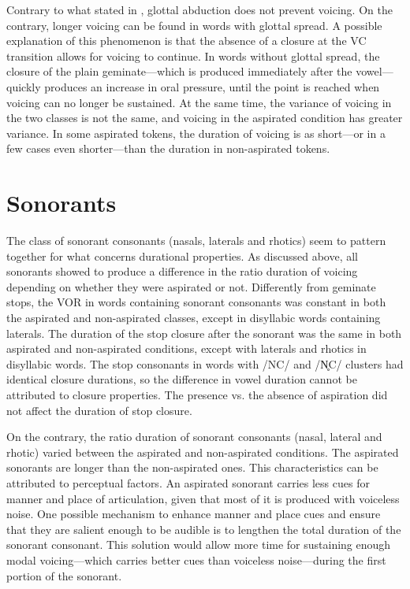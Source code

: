 \documentclass[11pt,a4paper,openany]{memoir}\usepackage[]{graphicx}\usepackage[]{color}
\begin{document}
Contrary to what stated in , glottal abduction does not prevent voicing.
On the contrary, longer voicing can be found in words with glottal spread.
A possible explanation of this phenomenon is that the absence of a closure at the VC transition allows for voicing to continue.
In words without glottal spread, the closure of the plain geminate---which is produced immediately after the vowel---quickly produces an increase in oral pressure, until the point is reached when voicing can no longer be sustained.
At the same time, the variance of voicing in the two classes is not the same, and voicing in the aspirated condition has greater variance.
In some aspirated tokens, the duration of voicing is as short---or in a few cases even shorter---than the duration in non-aspirated tokens.

\section{Sonorants}
The class of sonorant consonants (nasals, laterals and rhotics) seem to pattern together for what concerns durational properties.
As discussed above, all sonorants showed to produce a difference in the ratio duration of voicing depending on whether they were aspirated or not.
Differently from geminate stops, the VOR in words containing sonorant consonants was constant in both the aspirated and non-aspirated classes, except in disyllabic words containing laterals.
The duration of the stop closure after the sonorant was the same in both aspirated and non-aspirated conditions, except with laterals and rhotics in disyllabic words.
The stop consonants in words with /NC/ and /N̥C/ clusters had identical closure durations, so the difference in vowel duration cannot be attributed to closure properties.
The presence vs. the absence of aspiration did not affect the duration of stop closure.

On the contrary, the ratio duration of sonorant consonants (nasal, lateral and rhotic) varied between the aspirated and non-aspirated conditions.
The aspirated sonorants are longer than the non-aspirated ones.
This characteristics can be attributed to perceptual factors.
An aspirated sonorant carries less cues for manner and place of articulation, given that most of it is produced with voiceless noise.
One possible mechanism to enhance manner and place cues and ensure that they are salient enough to be audible is to lengthen the total duration of the sonorant consonant.
This solution would allow more time for sustaining enough modal voicing---which carries better cues than voiceless noise---during the first portion of the sonorant.
\end{document}
